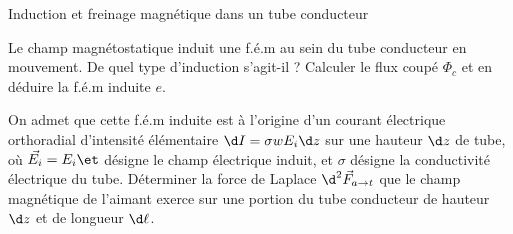 \begin{exo}[PC][3][TD]{Induction et freinage magnétique dans un tube conducteur}
\begin{quest}
  \item Le champ magnétostatique induit une f.é.m au sein du tube conducteur en mouvement. De quel type d'induction s'agit-il ? Calculer le flux coupé $\Phi_c$ et en déduire la f.é.m induite $e$.
  \item On admet que cette f.é.m induite est à l'origine d'un courant électrique orthoradial d'intensité élémentaire $\d I = \sigma w E_i \d z$ sur une hauteur $\d z$ de tube, où $\Vec{E_i} = E_i \et$ désigne le champ électrique induit, et $\sigma$ désigne la conductivité électrique du tube. Déterminer la force de Laplace $\d^2\Vec{F}_{a\rightarrow t}$ que le champ magnétique de l'aimant exerce sur une portion du tube conducteur de hauteur $\d z$ et de longueur $\d \ell$. 


\end{quest}
\end{exo}
